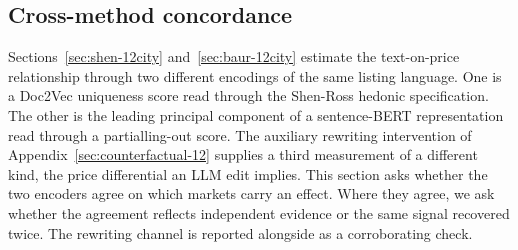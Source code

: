 
\subsection{Cross-method concordance}
\label{sec:cross-method-12}

Sections~\ref{sec:shen-12city} and~\ref{sec:baur-12city} estimate the text-on-price relationship through two different encodings of the same listing language. One is a Doc2Vec uniqueness score read through the Shen-Ross hedonic specification. The other is the leading principal component of a sentence-BERT representation read through a partialling-out score. The auxiliary rewriting intervention of Appendix~\ref{sec:counterfactual-12} supplies a third measurement of a different kind, the price differential an LLM edit implies. This section asks whether the two encoders agree on which markets carry an effect. Where they agree, we ask whether the agreement reflects independent evidence or the same signal recovered twice. The rewriting channel is reported alongside as a corroborating check.

